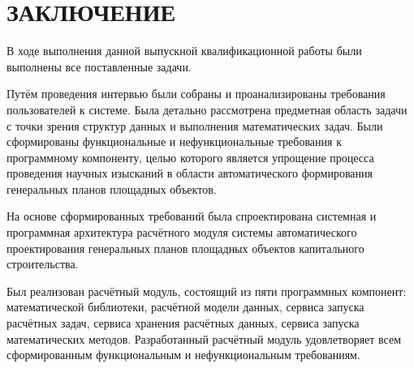 \section*{\large{ЗАКЛЮЧЕНИЕ}}

В ходе выполнения данной выпускной квалификационной работы были выполнены все поставленные задачи.

Путём проведения интервью были собраны и проанализированы требования пользователей к системе.
Была детально рассмотрена предметная область задачи с точки зрения структур данных
и выполнения математических задач.
Были сформированы функциональные и нефункциональные требования к программному компоненту, целью
которого является упрощение процесса проведения научных изысканий
в области автоматического формирования генеральных планов площадных объектов.

На основе сформированных требований была спроектирована системная и программная архитектура
расчётного модуля системы автоматического проектирования генеральных
планов площадных объектов капитального строительства.

Был реализован расчётный модуль, состоящий из пяти программных компонент: математической библиотеки,
расчётной модели данных, сервиса запуска расчётных задач, сервиса хранения расчётных данных,
сервиса запуска математических методов.
Разработанный расчётный модуль удовлетворяет всем сформированным функциональным и нефункциональным требованиям.
